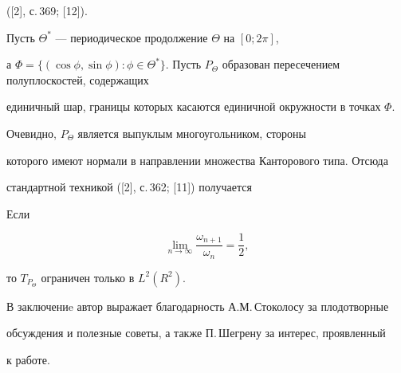 ([2], с.\,369; [12]).





Пусть $\Theta^*$ --- периодическое продолжение $\Theta $ на $[0;2 \pi]$,


а $\Phi=\{(\cos \phi, \sin \phi) : \phi \in \Theta^*


\}$. Пусть $P_{\Theta}$ образован пересечением полуплоскостей, содержащих


единичный шар, границы которых касаются единичной окружности в точках $\Phi$.


Очевидно, $P_{\Theta}$ является выпуклым многоугольником, стороны


которого имеют нормали в направлении множества Канторового типа. Отсюда


стандартной техникой ([2], с.\,362; [11]) получается





\begin{thm}


Если


$$


\lim_{n \to \infty} \frac {\omega_{n+1}} {\omega_n} =


\frac {1} {2},


$$


то $T_{P_{\Theta}}$ ограничен только в $L^2 (R^2)$.


\end{thm}





В заключениe автор выражает благодарность А.М.\,Стоколосу за плодотворные


обсуждения и полезные советы, а также П.\,Шегрену за интерес, проявленный


к работе.





